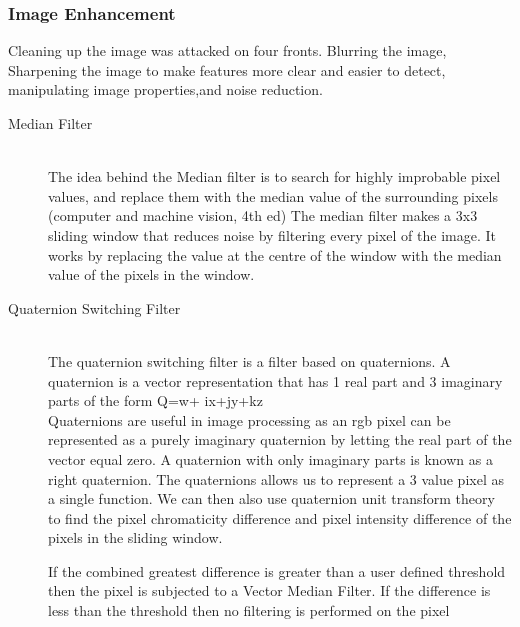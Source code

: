 \subsubsection{Image Enhancement}
Cleaning up the image was attacked on four fronts. Blurring the image, Sharpening the image to make features more clear and easier to detect, manipulating image properties,and noise reduction. 
\begin{description}
\item[Median Filter]\hfill \\The idea behind the Median filter is to search for highly improbable pixel values, and replace them with the median value of the surrounding pixels (computer and machine vision, 4th ed)
The median filter makes a 3x3 sliding window that reduces noise by filtering every pixel of the image. It works by replacing the value at the centre of the window with the median value of the pixels in the window.

\item[Quaternion Switching Filter]\hfill \\
The quaternion switching filter \cite{web:QNSF} is a filter based on quaternions.
A quaternion is a vector representation that has 1 real part and 3 imaginary parts of the form 
Q=w+ ix+jy+kz \cite{article:Hamilton1844}
\\Quaternions are useful in image processing as an rgb pixel can be represented as a purely imaginary quaternion by letting the real part of the vector equal zero. A quaternion with only imaginary parts is known as a right quaternion.\cite{article:Hamilton1866}
The quaternions allows us to represent a 3 value pixel as a single function. We can then also use quaternion unit transform theory to find the pixel chromaticity difference and pixel intensity difference of the pixels in the sliding window.

If the combined greatest difference is greater than a user defined threshold then the pixel is subjected to a Vector Median Filter. If the difference is less than the threshold then no filtering is performed on the pixel
\end{description}
 
